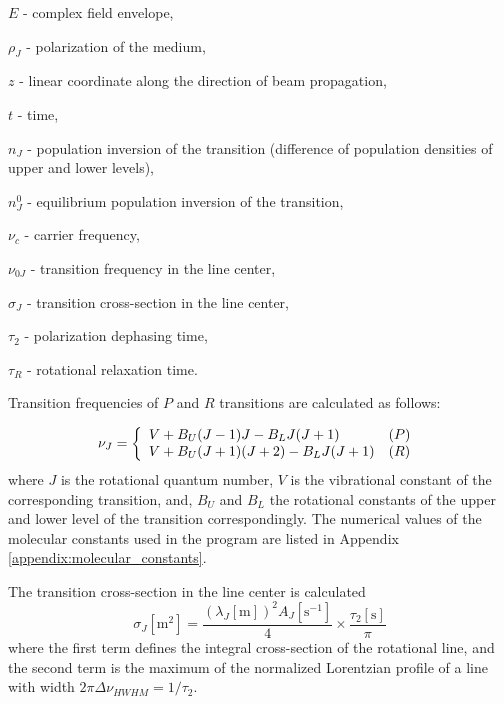 \documentclass{report}
\begin{document}
$E$ - complex field envelope,

$\rho_J$ - polarization of the medium,

$z$ - linear coordinate along the direction of beam propagation,

$t$ - time,

$n_J$ - population inversion of the transition (difference of population densities of upper and lower levels),

$n_J^0$ - equilibrium population inversion of the transition,

$\nu _c$ - carrier frequency,

$\nu_{0J}$ - transition frequency in the line center,

$\sigma_J$ - transition cross-section in the line center,

$\tau_2$ - polarization dephasing time,

$\tau_R$ - rotational relaxation time.

Transition frequencies of $P$ and $R$ transitions are calculated as follows:

\begin{equation}\label{eq:frequencies}
\nu_J = \left\{ \begin{array}{ll}
  V + B_U (J-1)J     - B_L J (J+1) & (P)\\
  V + B_U (J+1)(J+2) - B_L J (J+1) & (R)\end{array}\right.\\ 
\end{equation}
where $J$ is the rotational quantum number, $V$ is the vibrational constant of the corresponding transition, and, $B_U$ and $B_L$ the rotational constants of the upper and lower level of the transition correspondingly. The numerical values of the molecular constants used in the program are listed in Appendix \ref{appendix:molecular_constants}.

The transition cross-section in the line center is calculated \cite{Hilborn-2002}
\begin{equation}
{\sigma _J}[\text{m}^2] = \frac{(\lambda _J[\text{m}])^2 A_J[\text{s}^{-1}]}{4} \times \frac{\tau_2[\text{s}]}{\pi}
\end{equation}
where the first term defines the integral cross-section of the rotational line, and the second term is the maximum of the normalized Lorentzian profile of a line with width $2\pi\Delta\nu _{HWHM}=1/\tau_2$.
\end{document}
